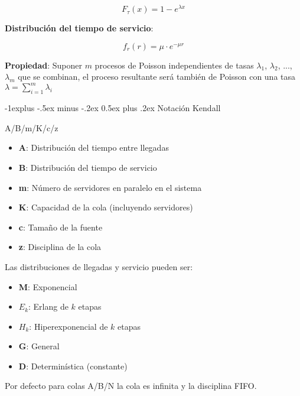 \documentclass[10pt,landscape]{article}
\makeatletter
\renewcommand{\subsection}{\@startsection{subsection}{2}{0mm}%
                                {-1explus -.5ex minus -.2ex}%
                                {0.5ex plus .2ex}%
                                {\normalfont\normalsize\bfseries}}
\makeatother
\begin{document}
\begin{multicols}{3}
	\begin{equation*}
		F_{\tau}(x) = 1 - e^{\lambda x}
	\end{equation*}
	
\textbf{Distribución del tiempo de servicio}:

	\begin{equation*}
	f_{r}(r) = \mu \cdot e^{- \mu r}
	\end{equation*}

\textbf{Propiedad}: Suponer $m$ procesos de Poisson independientes de tasas $\lambda_{1}$, $\lambda_{2}$, ..., $\lambda_{m}$ que se combinan, el proceso resultante será también de Poisson con una tasa $\lambda = \sum_{i = 1}^{m} \lambda_{i}$
	
\subsection{Notación Kendall}
	
	\begin{center}
		\large{A/B/m/K/c/z}
	\end{center}
	
	\begin{itemize}
		\item \textbf{A}: Distribución del tiempo entre llegadas
		\item \textbf{B}: Distribución del tiempo de servicio
		\item \textbf{m}: Número de servidores en paralelo en el sistema
		\item \textbf{K}: Capacidad de la cola (incluyendo servidores)
		\item \textbf{c}: Tamaño de la fuente
		\item \textbf{z}: Disciplina de la cola
	\end{itemize}

Las distribuciones de llegadas y servicio pueden ser:

	\begin{itemize}
		\item \textbf{M}: Exponencial
		\item \textbf{$E_{k}$}: Erlang de $k$ etapas
		\item \textbf{$H_{k}$}: Hiperexponencial de $k$ etapas
		\item \textbf{G}: General
		\item \textbf{D}: Determinística (constante)
	\end{itemize}
	
Por defecto para colas A/B/N la cola es infinita y la disciplina FIFO.


\end{multicols}
\end{document}
